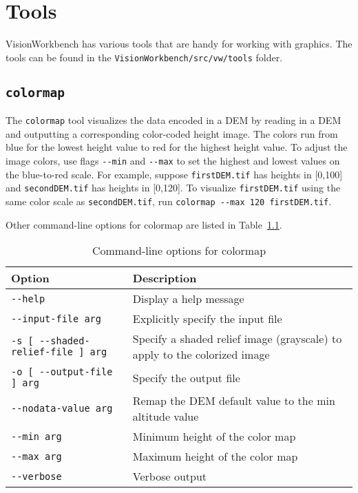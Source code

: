\chapter{Tools}\label{ch:tools}

VisionWorkbench has various tools that are handy for working with graphics. The tools can be found in the \verb#VisionWorkbench/src/vw/tools# folder.

\section{{\tt colormap}}\label{sec:colormap}

The \verb#colormap# tool visualizes the data encoded in a DEM by reading in a DEM and outputting a corresponding color-coded height image. The colors run from blue for the lowest height value to red for the highest height value.  To adjust the image colors, use flags \verb#--min# and \verb#--max# to set the highest and lowest values on the blue-to-red scale.  For example, suppose \verb#firstDEM.tif# has heights in [0,100] and \verb#secondDEM.tif# has heights in [0,120]. To visualize \verb#firstDEM.tif# using the same color scale as \verb#secondDEM.tif#, run \verb#colormap --max 120 firstDEM.tif#.

Other command-line options for colormap are listed in Table~\ref{tbl:colormap}.

\begin{longtable}{|l|p{10cm}|}
\caption{Command-line options for colormap}
\label{tbl:colormap}
\endfirsthead
\endhead
\endfoot
\endlastfoot
\hline
Option & Description \\ \hline \hline
\verb#--help# & Display a help message \\ \hline
\verb#--input-file arg# & Explicitly specify the input file \\ \hline
\verb#-s [ --shaded-relief-file ] arg# & Specify a shaded relief image (grayscale) to apply to the colorized image \\ \hline
\verb#-o [ --output-file ] arg# & Specify the output file \\ \hline
\verb#--nodata-value arg# & Remap the DEM default value to the min altitude value \\ \hline
\verb#--min arg# & Minimum height of the color map \\ \hline
\verb#--max arg# & Maximum height of the color map \\ \hline
\verb#--verbose# & Verbose output \\ \hline
\end{longtable}

